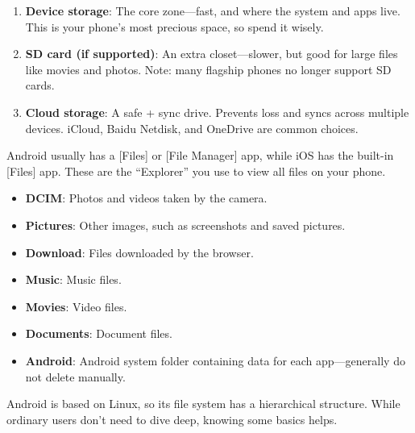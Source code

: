 


\begin{enumerate}
  \item \textbf{Device storage}: The core zone—fast, and where the system and apps live. This is your phone's most precious space, so spend it wisely.
  \item \textbf{SD card (if supported)}: An extra closet—slower, but good for large files like movies and photos. Note: many flagship phones no longer support SD cards.
  \item \textbf{Cloud storage}: A safe + sync drive. Prevents loss and syncs across multiple devices. iCloud, Baidu Netdisk, and OneDrive are common choices.
\end{enumerate}


Android usually has a [Files] or [File Manager] app, while iOS has the built-in [Files] app. These are the “Explorer” you use to view all files on your phone.


\begin{itemize}
  \item \textbf{DCIM}: Photos and videos taken by the camera.
  \item \textbf{Pictures}: Other images, such as screenshots and saved pictures.
  \item \textbf{Download}: Files downloaded by the browser.
  \item \textbf{Music}: Music files.
  \item \textbf{Movies}: Video files.
  \item \textbf{Documents}: Document files.
  \item \textbf{Android}: Android system folder containing data for each app—generally do not delete manually.
\end{itemize}


Android is based on Linux, so its file system has a hierarchical structure. While ordinary users don't need to dive deep, knowing some basics helps.

